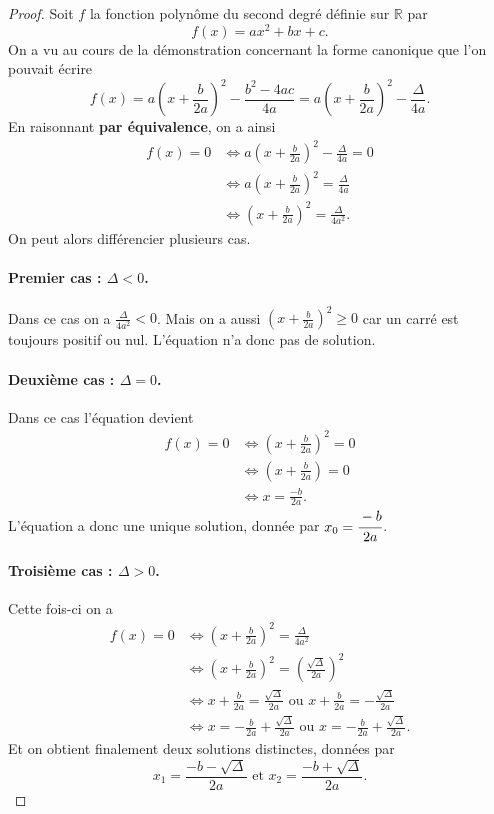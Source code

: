 \documentclass[11pt]{article}
\begin{document}
\begin{proof}
  Soit $f$ la fonction polynôme du second degré définie sur $\mathbb{R}$ par
  \[
    f(x) = ax^2+bx+c.
  \]
  On a vu au cours de la démonstration concernant la forme canonique que l'on
  pouvait écrire
  \[
    f(x) = a\left(x+\frac{b}{2a}\right)^2-\frac{b^2-4ac}{4a} =
    a\left(x+\frac{b}{2a}\right)^2-\frac{\Delta}{4a} .
  \]
  En raisonnant \textbf{par équivalence}, on a ainsi
  \begin{align*}
    f(x) = 0 &\Longleftrightarrow a\left( x+\frac{b}{2a}
    \right)^2-\frac{\Delta}{4a}=0 \\
    &\Longleftrightarrow a\left( x+\frac{b}{2a}
    \right)^2=\frac{\Delta}{4a} \\
    &\Longleftrightarrow \left( x+\frac{b}{2a}
    \right)^2=\frac{\Delta}{4a^2}.
  \end{align*}
  On peut alors différencier plusieurs cas.
  \paragraph{Premier cas : $\Delta<0$.} Dans ce cas on a
  $\frac{\Delta}{4a^2}<0$. Mais on a aussi $\left( x+\frac{b}{2a} \right)^2\geq0$
  car un carré est toujours positif ou nul. L'équation n'a donc pas de solution.
  \paragraph{Deuxième cas : $\Delta=0$.} Dans ce cas l'équation devient
  \begin{align*}
    f(x) = 0 &\Longleftrightarrow \left( x+\frac{b}{2a} \right)^2 = 0 \\
    &\Longleftrightarrow \left( x+\frac{b}{2a} \right) = 0 \\
    &\Longleftrightarrow x = \frac{-b}{2a}.
  \end{align*}
  L'équation a donc une unique solution, donnée par $x_0=\cfrac{-b}{2a}$.
  \paragraph{Troisième cas : $\Delta>0$.} Cette fois-ci on a
  \begin{align*}
    f(x) = 0 &\Longleftrightarrow \left( x+\frac{b}{2a} \right)^2 =
    \frac{\Delta}{4a^2} \\
    &\Longleftrightarrow \left( x+\frac{b}{2a} \right)^2 =
    \left( \frac{\sqrt\Delta}{2a} \right)^2 \\
    &\Longleftrightarrow x+\frac{b}{2a}=\frac{\sqrt\Delta}{2a}\text{ ou
    }x+\frac{b}{2a}=-\frac{\sqrt\Delta}{2a}\\
    &\Longleftrightarrow x=-\frac{b}{2a}+\frac{\sqrt\Delta}{2a}\text{ ou
    }x=-\frac{b}{2a}+\frac{\sqrt\Delta}{2a}.
  \end{align*}
  Et on obtient finalement deux solutions distinctes, données par
  \[
    x_1 = \frac{-b-\sqrt\Delta}{2a}\text{ et }x_2 =
    \frac{-b+\sqrt\Delta}{2a}.
  \]
\end{proof}
\end{document}

